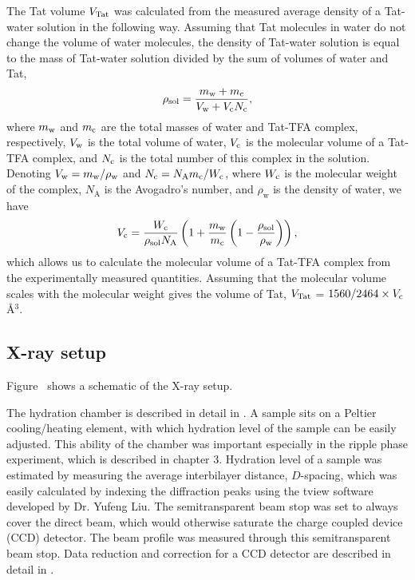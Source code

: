 The Tat volume $V_\textrm{Tat}$ was calculated from the measured average density of a 
Tat-water solution in the following way. Assuming that Tat
molecules in water do not change the volume of water molecules, the density
of Tat-water solution is equal to the mass of Tat-water solution divided
by the sum of volumes of water and Tat, 
\begin{equation}
  \rho_\textrm{sol} = \frac{m_\textrm{w}+m_\textrm{c}}{V_\textrm{w}+V_\textrm{c}N_\textrm{c}},
\end{equation}
where $m_\textrm{w}$ and $m_\textrm{c}$
are the total masses of water and Tat-TFA complex, respectively, 
$V_\textrm{w}$ is the total volume of 
water, $V_\textrm{c}$ is the molecular volume of a Tat-TFA complex, and $N_\textrm{c}$ is the total number 
of this complex in the solution. 
Denoting $V_\textrm{w}=m_\textrm{w}/\rho_\textrm{w}$ 
and $N_\textrm{c}=N_\textrm{A}m_\textrm{c}/W_\textrm{c}$, 
where $W_\textrm{c}$ is the molecular weight of the complex, 
$N_\textrm{A}$ is the Avogadro's number,
and $\rho_\textrm{w}$ is the density of water, we have
\begin{equation}
  V_\textrm{c} = \frac{W_\textrm{c}}{\rho_\textrm{sol}N_\textrm{A}} \left( 
        1 + \frac{m_\textrm{w}}{m_\textrm{c}}\left(1-\frac{\rho_\textrm{sol}}{\rho_\textrm{w}}\right) 
        \right),
\end{equation}
which allows us to calculate the molecular volume of a Tat-TFA complex 
from the experimentally measured quantities. 
Assuming that the molecular
volume scales with the molecular weight gives the volume of Tat, 
$V_\textrm{Tat}$ = $1560/2464\times V_\textrm{c}$ \AA$^3$. 

\subsection{X-ray setup}
Figure~ shows a schematic of the X-ray setup.

The hydration chamber is described in detail in \cite{Kucerka05}. A sample
sits on a Peltier cooling/heating element, with which hydration level of
the sample can be easily adjusted. This ability of the chamber was important
especially in the ripple phase experiment, which is described in chapter 3. 
Hydration level of a sample was estimated by measuring the average 
interbilayer distance, $D$-spacing, which was easily calculated by indexing the 
diffraction peaks using the tview software developed by Dr. Yufeng Liu.
The semitransparent beam stop was set to always cover the direct beam, which would
otherwise saturate the charge coupled device (CCD) detector. 
The beam profile was measured through
this semitransparent beam stop. Data reduction and correction for a CCD 
detector are described in detail in \cite{Barna99}.

